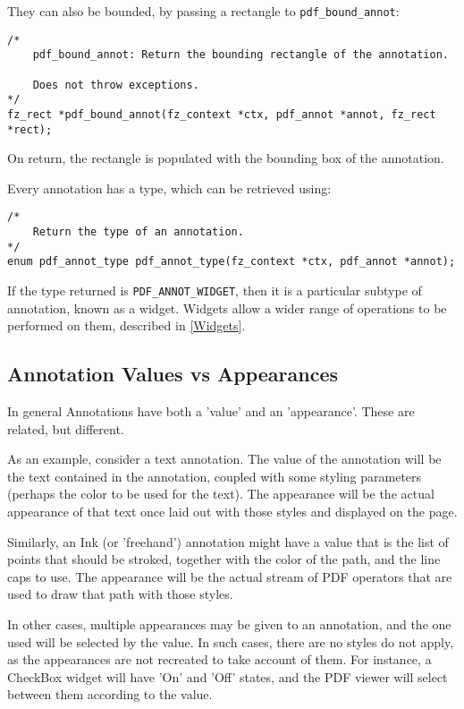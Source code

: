 \documentclass[oneside]{book}
\begin{document}
They can also be bounded, by passing a rectangle to \texttt{pdf\_bound\_annot}:

\begin{lstlisting}
/*
	pdf_bound_annot: Return the bounding rectangle of the annotation.

	Does not throw exceptions.
*/
fz_rect *pdf_bound_annot(fz_context *ctx, pdf_annot *annot, fz_rect *rect);
\end{lstlisting}

On return, the rectangle is populated with the bounding box of the annotation.

Every annotation has a type, which can be retrieved using:

\begin{lstlisting}
/*
	Return the type of an annotation.
*/
enum pdf_annot_type pdf_annot_type(fz_context *ctx, pdf_annot *annot);
\end{lstlisting}

If the type returned is \texttt{PDF\_ANNOT\_WIDGET}, then it is a particular subtype of annotation, known as a widget. Widgets allow a wider range of operations to be performed on them, described in \ref{Widgets}.

\subsection{Annotation Values vs Appearances}

In general Annotations have both a 'value' and an 'appearance'. These are related, but different.

As an example, consider a text annotation. The value of the annotation will be the text contained in the annotation, coupled with some styling parameters (perhaps the color to be used for the text). The appearance will be the actual appearance of that text once laid out with those styles and displayed on the page.

Similarly, an Ink (or 'freehand') annotation might have a value that is the list of points that should be stroked, together with the color of the path, and the line caps to use. The appearance will be the actual stream of PDF operators that are used to draw that path with those styles.

In other cases, multiple appearances may be given to an annotation, and the one used will be selected by the value. In such cases, there are no styles do not apply, as the appearances are not recreated to take account of them. For instance, a CheckBox widget will have 'On' and 'Off' states, and the PDF viewer will select between them according to the value.
\end{document}
